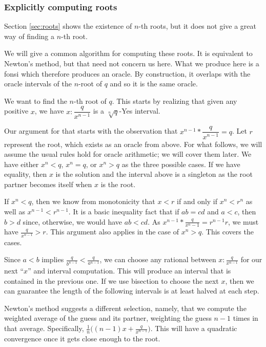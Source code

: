 \documentclass[12pt]{article}
\theoremstyle{remark}
\begin{document}
\subsubsection{Explicitly computing roots}

Section \ref{sec:roots} shows the existence of $n$-th roots, but it does not give a great way of finding a $n$-th root. 

We will give a common algorithm for computing these roots. It is equivalent to Newton's method, but that need not concern us here. What we produce here is a fonsi which therefore produces an oracle. By construction, it overlaps with the oracle intervals of the $n$-root of $q$ and so it is the same oracle. 

We want to find the $n$-th root of $q$. This starts by realizing that given any positive $x$, we have $x:\dfrac{q}{x^{n-1}}$ is a $\sqrt[n]{q}$-Yes interval. 

Our argument for that starts with the observation that $x^{n-1}*\dfrac{q}{x^{n-1}} = q$. Let $r$ represent the root, which exists as an oracle from above. For what follows, we will assume the usual rules hold for oracle arithmetic; we will cover them later. We have either $x^n < q$, $x^n = q$, or $x^n > q$ as the three possible cases. If we have equality, then $x$ is the solution and the interval above is a singleton as the root partner becomes itself when $x$ is the root. 

If $x^n < q$, then we know from monotonicity that $x < r$ if and only if $x^n < r^n$ as well as $x^{n-1} < r^{n-1}$. It is a basic inequality fact that if $ab = cd$ and $a < c $, then $b > d$ since, otherwise, we would have $ab < cd$. As $x^{n-1} * \frac{q}{x^n-1} = r^{n-1} r$, we must have $\frac{q}{x^{n-1}} > r$. This argument also applies in the case of $x^n > q$. This covers the cases. 

Since $a<b$ implies $\frac{q}{b^{n-1}} < \frac{q}{a^{n-1}}$, we can choose any rational between $x:\frac{q}{x^{n-1}}$ for our next ``$x$'' and interval computation. This will produce an interval that is contained in the previous one. If we use bisection to choose the next $x$, then we can guarantee the length of the following intervals is at least halved at each step. 

Newton's method suggests a different selection, namely, that we compute the weighted average of the guess and its partner, weighting the guess $n-1$ times in that average. Specifically, $\frac{1}{n} \big( (n-1) x + \frac{q}{x^{n-1}} \big)$. This will have a quadratic convergence once it gets close enough to the root.
\end{document}
